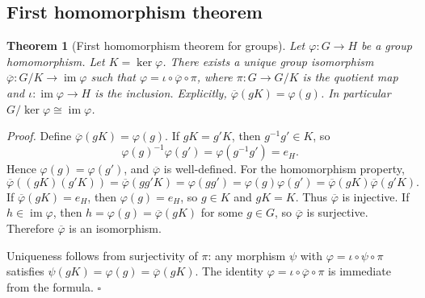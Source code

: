 \documentclass[11pt,letterpaper]{article}
\newcommand{\Map}[3]{#1 \colon #2 \to #3}
\newtheorem{theorem}{Theorem}
\newenvironment{proof}{\noindent\textit{Proof.}}{\hfill\(\square\)}
\begin{document}
\subsection{First homomorphism theorem}

\begin{theorem}[First homomorphism theorem for groups]
\label{thm:group-first}
Let \(\Map{\varphi}{G}{H}\) be a group homomorphism. Let \(K=\ker\varphi\). There exists a unique group isomorphism \(\Map{\overline{\varphi}}{G/K}{\operatorname{im}\varphi}\) such that \(\varphi=\iota\circ\overline{\varphi}\circ\pi\), where \(\Map{\pi}{G}{G/K}\) is the quotient map and \(\Map{\iota}{\operatorname{im}\varphi}{H}\) is the inclusion. Explicitly, \(\overline{\varphi}(gK)=\varphi(g)\). In particular \(G/\ker\varphi\cong\operatorname{im}\varphi\).
\end{theorem}

\begin{proof}
Define \(\overline{\varphi}(gK)=\varphi(g)\). If \(gK=g'K\), then \(g^{-1}g'\in K\), so
\[
\varphi(g)^{-1}\varphi(g')=\varphi(g^{-1}g')=e_H.
\]
Hence \(\varphi(g)=\varphi(g')\), and \(\overline{\varphi}\) is well-defined. For the homomorphism property,
\[
\overline{\varphi}((gK)(g'K))=\overline{\varphi}(gg'K)=\varphi(gg')=\varphi(g)\varphi(g')=\overline{\varphi}(gK)\overline{\varphi}(g'K).
\]
If \(\overline{\varphi}(gK)=e_H\), then \(\varphi(g)=e_H\), so \(g\in K\) and \(gK=K\). Thus \(\overline{\varphi}\) is injective. If \(h\in\operatorname{im}\varphi\), then \(h=\varphi(g)=\overline{\varphi}(gK)\) for some \(g\in G\), so \(\overline{\varphi}\) is surjective. Therefore \(\overline{\varphi}\) is an isomorphism.

Uniqueness follows from surjectivity of \(\pi\): any morphism \(\psi\) with \(\varphi=\iota\circ\psi\circ\pi\) satisfies \(\psi(gK)=\varphi(g)=\overline{\varphi}(gK)\). The identity \(\varphi=\iota\circ\overline{\varphi}\circ\pi\) is immediate from the formula.
\end{proof}

\begin{center}
\end{center}
\end{document}
